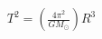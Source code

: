 \documentclass[preview]{standalone}
\begin{document}
\begin{align*}
T^2 = \left(\frac{4\pi ^2}{GM_{\odot}}\right) R^3
\end{align*}
\end{document}
